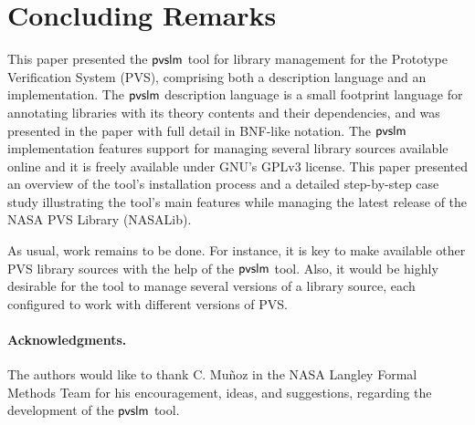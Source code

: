 \section{Concluding Remarks}
\label{sec.concl}

This paper presented the $\textsf{pvslm}$ tool for library management for the
Prototype Verification System (PVS), comprising both a description
language and an implementation. The $\textsf{pvslm}$ description language is a
small footprint language for annotating libraries with its theory
contents and their dependencies, and was presented in the paper with
full detail in BNF-like notation. The $\textsf{pvslm}$ implementation features
support for managing several library sources available online and it
is freely available under GNU's GPLv3 license.  This paper presented
an overview of the tool's installation process and a detailed
step-by-step case study illustrating the tool's main features while
managing the latest release of the NASA PVS Library (NASALib).

As usual, work remains to be done. For instance, it is key to make
available other PVS library sources with the help of the $\textsf{pvslm}$
tool. Also, it would be highly desirable for the tool to manage
several versions of a library source, each configured to work with
different versions of PVS.

{\small
\paragraph{\bf Acknowledgments.} The authors would like to thank
C. Mu\~noz in the NASA Langley Formal Methods Team for his
encouragement, ideas, and suggestions, regarding the development of
the $\textsf{pvslm}$ tool.}
